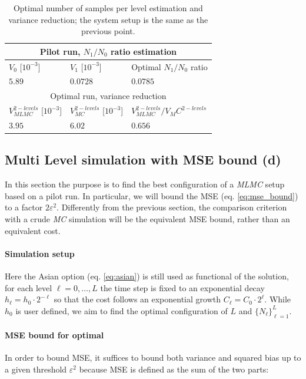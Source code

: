 \begin{table}[h]
\begin{tabular}{ |p{4cm}|p{4cm}|p{4cm}|  }
\hline
\multicolumn{3}{|c|}{Pilot run, $N_1 / N_0$ ratio estimation} \\
\hline
$V_0$ [$10^{-3}$] & $V_1$ [$10^{-3}$] & Optimal $N_1 / N_0$ ratio \\
$5.89$ & $0.0728$ & $0.0785$ \\
\hline
\multicolumn{3}{|c|}{Optimal run, variance reduction} \\
\hline
$V_{MLMC}^{2-levels}$ [$10^{-3}$] & $V_{MC}^{2-levels}$ [$10^{-3}$] & $V_{MLMC}^{2-levels} / V_MC^{2-levels}$ \\
$3.95$ & $6.02$ & $0.656$ \\
\hline
\end{tabular}
\caption{Optimal number of samples per level estimation and variance reduction; the system setup is the same as the previous point.}
\label{tab:two_levels}
\end{table}

\subsection{Multi Level simulation with MSE bound (d)}

In this section the purpose is to find the best configuration of a \textit{MLMC} setup based on a pilot run. In particular, we will bound the MSE (eq. \ref{eq:mse_bound}) to a factor $2\varepsilon^2$. 
Differently from the previous section, the comparison criterion with a crude \textit{MC} simulation will be the equivalent MSE bound, rather than an equivalent cost. 

\paragraph{Simulation setup}
Here the Asian option (eq. \ref{eq:asian}) is still used as functional of the solution, for each level $\ell = 0,\dots,L$ the time step is fixed to an exponential decay $h_\ell = h_0 \cdot 2^{-\ell}$ so that the cost follows an exponential growth $C_\ell = C_0 \cdot 2^\ell$. 
While $h_0$ is user defined, we aim to find the optimal configuration of $L$ and $\{N_\ell\}_{\ell = 1}^L$.

\paragraph{MSE bound for optimal}
In order to bound MSE, it suffices to bound both variance and squared bias up to a given threshold $\varepsilon^2$ because MSE is defined as the sum of the two parts:

